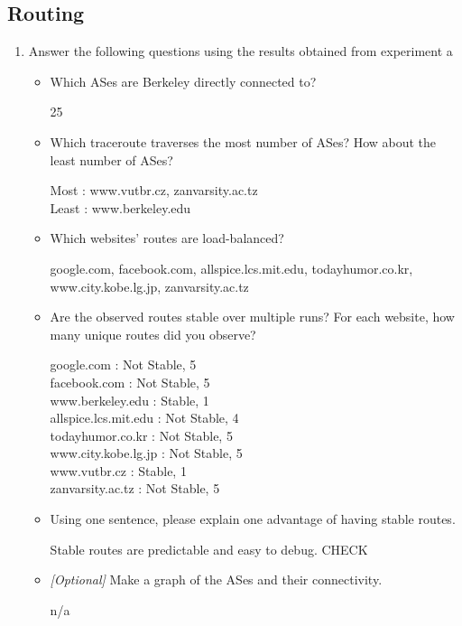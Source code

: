 \documentclass[10pt]{article}
\begin{document}
\newpage
\subsection*{Routing}

\begin{enumerate}

\item Answer the following questions using the results obtained from experiment a

\begin{itemize}

\item Which ASes are Berkeley directly connected to?

25

\item Which traceroute traverses the most number of ASes? How about the least number of ASes?

Most : www.vutbr.cz, zanvarsity.ac.tz \\
Least : www.berkeley.edu

\item Which websites' routes are load-balanced?

google.com, facebook.com, allspice.lcs.mit.edu, todayhumor.co.kr, www.city.kobe.lg.jp, zanvarsity.ac.tz

\item Are the observed routes stable over multiple runs? For each website, how many unique routes did you observe?

google.com : Not Stable, 5 \\
facebook.com : Not Stable, 5 \\
www.berkeley.edu : Stable, 1 \\
allspice.lcs.mit.edu : Not Stable, 4 \\
todayhumor.co.kr : Not Stable, 5 \\
www.city.kobe.lg.jp : Not Stable, 5 \\
www.vutbr.cz : Stable, 1 \\
zanvarsity.ac.tz : Not Stable, 5

\item Using one sentence, please explain one advantage of having stable routes.

Stable routes are predictable and easy to debug. CHECK

\item \emph{[Optional]} Make a graph of the ASes and their connectivity.

n/a


\end{itemize}
\end{enumerate}
\end{document}
